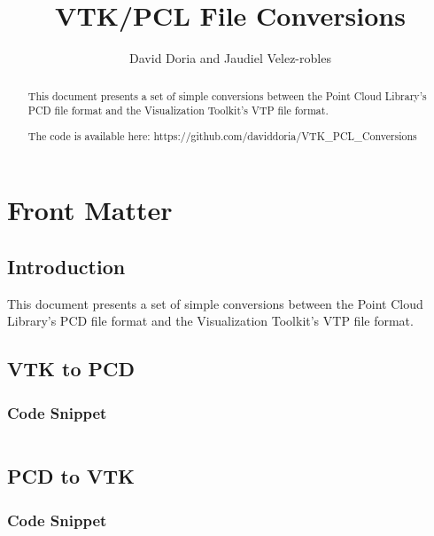 \documentclass{ComputationalAlgorithmsArticle}
\title{VTK/PCL File Conversions}
\author{David Doria and Jaudiel Velez-robles}
\newcommand{\IJhandlerIDnumber}{3303}
\begin{document}
\IJhandlefooter{\IJhandlerIDnumber}


\ifpdf
\else
\fi


\maketitle


\ifhtml
\chapter*{Front Matter\label{front}}
\fi

\begin{abstract}
\noindent

This document presents a set of simple conversions between the Point Cloud Library's PCD file format and the Visualization Toolkit's VTP file format.

The code is available here:
https://github.com/daviddoria/VTK_PCL_Conversions

\end{abstract}

\IJhandlenote{\IJhandlerIDnumber}

\tableofcontents
\section{Introduction}
This document presents a set of simple conversions between the Point Cloud Library's PCD file format and the Visualization Toolkit's VTP file format.

\section{VTK to PCD}

\subsection{Code Snippet}

\begin{verbatim}
\end{verbatim}

\section{PCD to VTK}

\subsection{Code Snippet}

\begin{verbatim}
\end{verbatim}
\end{document}
